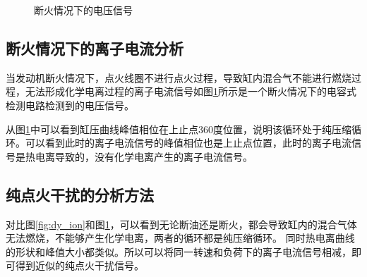 \begin{figure}[H]
\begin{minipage}[t]{0.5\linewidth}
	\caption{断火情况下的电压信号}
	\label{fig:dh_ion}
\end{minipage}
\end{figure}
\subsection{断火情况下的离子电流分析}   
当发动机断火情况下，点火线圈不进行点火过程，导致缸内混合气不能进行燃烧过程，无法形成化学电离过程的离子电流信号如图\ref{fig:dh_ion}所示是一个断火情况下的电容式检测电路检测到的电压信号。
\par 从图\ref{fig:dh_ion}中可以看到缸压曲线峰值相位在上止点360度位置，说明该循环处于纯压缩循环。可以看到此时的离子电流信号的峰值相位也是上止点位置，此时的离子电流信号是热电离导致的，没有化学电离产生的离子电流信号。
\subsection{纯点火干扰的分析方法}
对比图\ref{fig:dy_ion}和图\ref{fig:dh_ion}，可以看到无论断油还是断火，都会导致缸内的混合气体无法燃烧，不能够产生化学电离，两者的循环都是纯压缩循环。
同时热电离曲线的形状和峰值大小都类似。所以可以将同一转速和负荷下的离子电流信号相减，即可得到近似的纯点火干扰信号。
